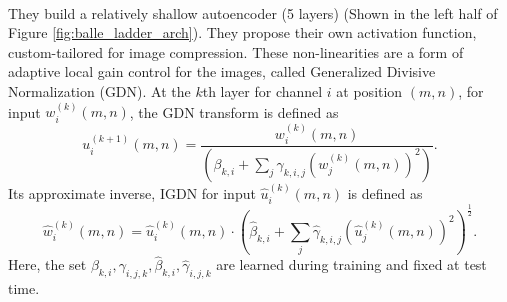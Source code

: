 \paragraph{\cite{balle2016end}} They build a relatively shallow autoencoder (5
layers) (Shown in the left half of Figure \ref{fig:balle_ladder_arch}).
They propose their own activation function, custom-tailored for image
compression. These non-linearities are a form of adaptive local gain control
for the images, called Generalized Divisive Normalization (GDN). At the $k$th layer for
channel $i$ at position $(m, n)$, for input $w_i^{(k)}(m, n)$, the GDN
transform is defined as
\begin{equation}
  \label{eq:gdn_def}
  u_i^{(k + 1)}(m, n) = \frac{w_i^{(k)}(m, n)}{
    \left( \beta_{k, i} + \sum_j \gamma_{k, i, j}
      \left( w_{j}^{(k)}(m, n)\right)^2 \right)}.
\end{equation}
Its approximate inverse, IGDN for input $\hat{u}_i^{(k)}(m, n)$ is defined as
\begin{equation}
  \label{eq:igdn_def}
  \hat{w}_i^{(k)}(m, n) = \hat{u}_i^{(k)}(m, n) \cdot \left(
    \hat{\beta}_{k, i} + \sum_{j} \hat{\gamma}_{k, i, j} \left(
      \hat{u}_j^{(k)}(m, n)\right)^2 \right)^{\frac{1}{2}}.
\end{equation}
Here, the set $\beta_{k, i}, \gamma_{i, j, k}, \hat{\beta}_{k, i},
\hat{\gamma}_{i, j, k}$ are learned during training and fixed at test time.

